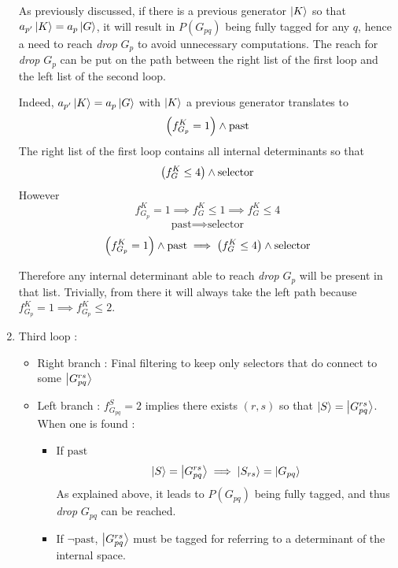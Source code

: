\documentclass[./thesis.tex]{subfiles}
\begin{document}
\begin{enumerate}
As previously discussed, if there is a previous generator $\ket K$ so that $a_{p'} \ket K = a_p \ket G$, it will result in $P(G_{pq})$ being fully tagged for any $q$, hence a need to reach \emph{drop} $G_p$ to avoid unnecessary computations.
The reach for \emph{drop} $G_p$ can be put on the path between the right list of the first loop and the left list of the second loop.

Indeed, $a_{p'} \ket K = a_p \ket G$ with $\ket K$ a previous generator translates to
\begin{equation}
\qty(f^K_{G_{p}} = 1) \wedge \text{past}
\end{equation}
The right list of the first loop contains all internal determinants so that
\begin{equation}
\qty(f^K_G \leq 4) \wedge \text{selector}
\end{equation}
However 
\begin{equation}
f^K_{G_{p}} = 1 \implies f^K_G \leq 1 \implies f^K_G \leq 4
\end{equation}
\begin{equation}
\text{past} \implies \text{selector}
\end{equation}
\begin{equation}
\qty(f^K_{G_{p}} = 1) \wedge \text{past} \implies\qty (f^K_G \leq 4) \wedge \text{selector}
\end{equation}

Therefore any internal determinant able to reach \emph{drop} $G_p$ will be present in that list. Trivially, from there it will always take the left path because $f^K_{G_{p}} = 1 \implies f^K_{G_{p}} \leq 2$.


\item
Third loop :
\begin{itemize}

\item
Right branch :
Final filtering to keep only selectors that do connect to some $\ket{G^{rs}_{pq}}$
\item
Left branch : $f_{G_{pq}}^S = 2$ implies there exists $(r,s)$ so that $\ket S=\ket{G^{rs}_{pq}}$. When one is found :
\begin{itemize}
\item
If $\text{past}$
\begin{equation}
\ket S=\ket {G_{pq}^{rs}} \implies \ket {S_{rs}} = \ket {G_{pq}}
\end{equation}
As explained above, it leads to $P(G_{pq})$ being fully tagged, and thus \emph{drop} $G_{pq}$ can be reached.
\item
If $\neg \text{past}$, $\ket {G_{pq}^{rs}}$ must be tagged for referring to a determinant of the internal space.
\end{itemize}



\end{itemize}

\end{enumerate}
\end{document}
